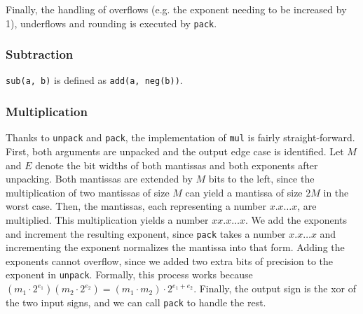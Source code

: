 \documentclass[a4paper,UKenglish,cleveref, autoref, thm-restate]{lipics-v2019}
\begin{document}
Finally, the handling of overflows (e.g. the exponent needing to be increased by 1), underflows and rounding is executed by \verb|pack|.

\subsubsection{Subtraction}
\verb|sub(a, b)| is defined as \verb|add(a, neg(b))|.

\subsubsection{Multiplication}
Thanks to \verb|unpack| and \verb|pack|, the implementation of \verb|mul| is fairly straight-forward. First, both arguments are unpacked and the output edge case is identified. 
Let $M$ and $E$ denote the bit widths of both mantissas and both exponents after unpacking.
Both mantissas are extended by $M$ bits to the left, since the multiplication of two mantissas of size $M$ can yield a mantissa of size $2M$ in the worst case. Then, the mantissas, each representing a number $x.x\dots x$, are multiplied. This multiplication yields a number $xx.x\dots x$. We add the exponents and increment the resulting exponent, since \verb|pack| takes a number $x.x \dots x$ and incrementing the exponent normalizes the mantissa into that form. Adding the exponents cannot overflow, since we added two extra bits of precision to the exponent in \verb|unpack|. Formally, this process works because $(m_1 \cdot 2^{e_1})(m_2 \cdot 2^{e_2}) = (m_1 \cdot m_2) \cdot 2^{e_1 + e_2}$. Finally, the output sign is the xor of the two input signs, and we can call \verb|pack| to handle the rest.
\end{document}
